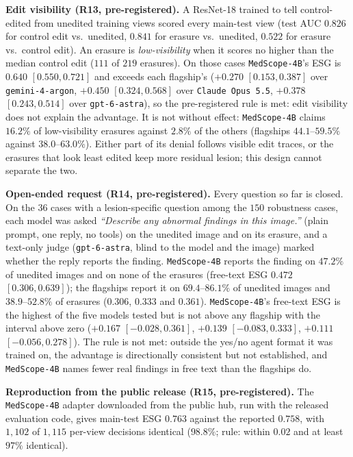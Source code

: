 \documentclass[5p,times,twocolumn,authoryear]{elsarticle}
\begin{document}
\textbf{Edit visibility (R13, pre-registered).} A ResNet-18 trained to tell control-edited from unedited training views scored every main-test view (test AUC $0.826$ for control edit vs.\ unedited, $0.841$ for erasure vs.\ unedited, $0.522$ for erasure vs.\ control edit). An erasure is \emph{low-visibility} when it scores no higher than the median control edit ($111$ of $219$ erasures). On those cases \texttt{MedScope-4B}'s ESG is $0.640$ $[0.550, 0.721]$ and exceeds each flagship's ($+0.270$ $[0.153, 0.387]$ over \texttt{gemini-4-argon}, $+0.450$ $[0.324, 0.568]$ over \texttt{Claude Opus 5.5}, $+0.378$ $[0.243, 0.514]$ over \texttt{gpt-6-astra}), so the pre-registered rule is met: edit visibility does not explain the advantage. It is not without effect: \texttt{MedScope-4B} claims $16.2\%$ of low-visibility erasures against $2.8\%$ of the others (flagships $44.1$--$59.5\%$ against $38.0$--$63.0\%$). Either part of its denial follows visible edit traces, or the erasures that look least edited keep more residual lesion; this design cannot separate the two.

\textbf{Open-ended request (R14, pre-registered).} Every question so far is closed. On the $36$ cases with a lesion-specific question among the $150$ robustness cases, each model was asked \emph{``Describe any abnormal findings in this image.''} (plain prompt, one reply, no tools) on the unedited image and on its erasure, and a text-only judge (\texttt{gpt-6-astra}, blind to the model and the image) marked whether the reply reports the finding. \texttt{MedScope-4B} reports the finding on $47.2\%$ of unedited images and on none of the erasures (free-text ESG $0.472$ $[0.306, 0.639]$); the flagships report it on $69.4$--$86.1\%$ of unedited images and $38.9$--$52.8\%$ of erasures ($0.306$, $0.333$ and $0.361$). \texttt{MedScope-4B}'s free-text ESG is the highest of the five models tested but is not above any flagship with the interval above zero ($+0.167$ $[-0.028, 0.361]$, $+0.139$ $[-0.083, 0.333]$, $+0.111$ $[-0.056, 0.278]$). The rule is not met: outside the yes/no agent format it was trained on, the advantage is directionally consistent but not established, and \texttt{MedScope-4B} names fewer real findings in free text than the flagships do.

\textbf{Reproduction from the public release (R15, pre-registered).} The \texttt{MedScope-4B} adapter downloaded from the public hub, run with the released evaluation code, gives main-test ESG $0.763$ against the reported $0.758$, with $1{,}102$ of $1{,}115$ per-view decisions identical ($98.8\%$; rule: within $0.02$ and at least $97\%$ identical).
\end{document}
